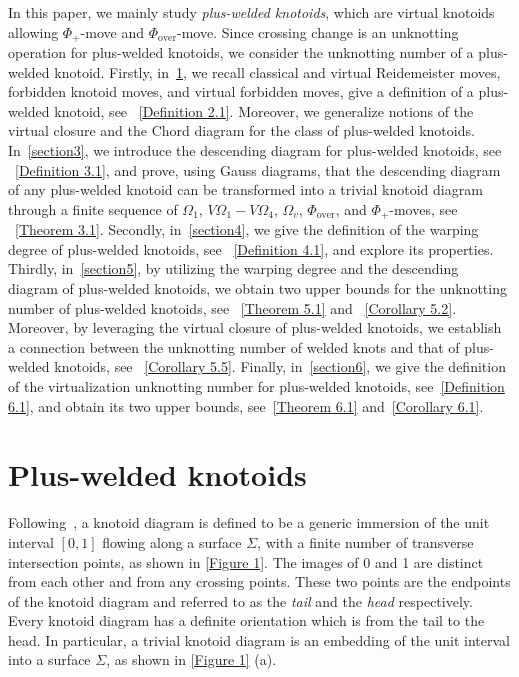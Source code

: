 \documentclass[11pt]{amsart}
\theoremstyle{noparens}
\numberwithin{equation}{section}
\numberwithin{equation}{section}
\begin{document}
 In this paper, we mainly study \textit{plus-welded  knotoids}, which are virtual knotoids allowing $\Phi_+$-move and $\Phi_{\text{over}}$-move. Since crossing change is an unknotting operation for plus-welded  knotoids, we consider the unknotting number of a plus-welded  knotoid.
Firstly, in~\cref{section2}, we recall classical and virtual Reidemeister moves, forbidden knotoid moves, and virtual forbidden moves, give a definition of a plus-welded knotoid, see ~\cref{Definition 2.1}. Moreover, we generalize notions of the virtual closure and the Chord diagram for the class of plus-welded knotoids.  
In~\cref{section3}, we introduce the descending diagram for plus-welded knotoids, see ~\cref{Definition 3.1}, and prove, using Gauss diagrams, that the descending diagram of any plus-welded knotoid can be transformed into a trivial  knotoid diagram through a finite sequence of $\Omega_1$, $V\Omega_1 - V\Omega_4$, $\Omega_v$, $\Phi_{\text{over}}$, and $\Phi_+$-moves, see ~\cref{Theorem 3.1}. 
Secondly, in~\cref{section4}, we give the definition of the warping degree of plus-welded  knotoids, see ~\cref{Definition 4.1}, and explore its properties.
Thirdly, in~\cref{section5}, by utilizing the warping degree and the descending diagram of plus-welded knotoids, we obtain two upper bounds for the unknotting number of plus-welded knotoids, see ~\cref{Theorem 5.1} and ~\cref{Corollary 5.2}.
Moreover, by leveraging the virtual closure of plus-welded  knotoids, we establish a connection between the unknotting number of welded knots and that of plus-welded  knotoids, see ~\cref{Corollary 5.5}. Finally, in~\cref{section6}, we give the definition of the virtualization unknotting number for plus-welded knotoids, see~\cref{Definition 6.1}, and obtain its two upper bounds, see~\cref{Theorem 6.1} and~\cref{Corollary 6.1}.

\section{Plus-welded  knotoids} \label{section2}

Following~\citep{turaev2012knotoids}, a knotoid diagram is defined to be a generic immersion of the unit interval $[0, 1]$ flowing along a surface \(\Sigma\), with a finite number of transverse intersection points, as shown in \cref{Figure 1}.
The images of 0 and 1 are distinct from each other and from any crossing points. These two points are the endpoints of the knotoid diagram and referred to as the \textit{tail} and the \textit{head} respectively. Every knotoid diagram has a definite orientation which is from the tail to the head.
In particular, a trivial knotoid diagram is an embedding of the unit interval into a surface \(\Sigma\), as shown in \cref{Figure 1} (a). 
\end{document}
